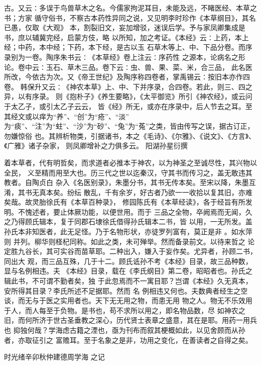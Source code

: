\documentclass[12pt,UTF8]{ctexbook}
\begin{document}
古。又云∶多误于鸟兽草木之名。今儒家拘泥耳目，未能及远，不睹医经、本草之书；方家 
循守俗书，不察古本药性异同之说，又见明李时珍作《本草纲目》，其名已愚，仅取《大观》 
本，割裂旧文，妄加增驳，迷误后学。予与家凤卿集成是书，庶以辅冀完经，启蒙方伎，略 
以所知，加之考证。《本经》云∶上药，本上经；中药，本中经；下药，本下经，是古以玉 
石草木等上、中、下品分卷。而序录别为一卷。陶序朱书云∶《本草经》卷上注云∶序药性 
之源本，论病名之形论。卷中云∶玉石、草木三品。卷下云∶虫、兽、果、菜、米，合三品， 
此名医所改，今依古为次。又《帝王世纪》及陶序称四卷者，掌禹锡云∶按旧本亦作四卷。 
韩保升又云∶《神农本草》上、中、下并序录，合四卷。若此，则三、四之异，以有序录。 
则《抱朴子》《养生要略》，《太平御览》所引《神农经》，或云问于太乙子，或引太乙子云云， 
皆《经》所无，或亦在序录中，后人节去之耳。至其经文或以痒为“养”、“创”为“疮”、“淡” 
为“痰”、“注”为“蛀”、“沙”为“砂”、“兔”为“菟”之类，皆由传写之误，据古订正， 
勿嫌惊俗 
也。其辨析物类，引据诸书，本之《毛诗》、《尔雅》、《说文》、《方言》、《广雅》诸子杂家， 
则凤卿增补之力俱多云。 
阳湖孙星衍撰

着本草者，代有明哲矣，而求道者必推本于神农，以为神圣之至诚尽性，其兴物以全民， 
义至精而用至大也。历三代之世以迄秦汉，守其书而传习之，盖无敢违其教者。自陶贞白 
杂入《名医别录》，朱墨分书，其书无传本矣。至宋以降，朱墨互淆，其书无真本矣。纷纭 
散乱，千有余岁，好古者乃欲一一收拾以复其旧，亦难矣哉。故灵胎徐氏有《本草百种录》， 
修园陈氏有《本草经读》，各于经旨有所发明。不愧述者，要止体厥功能，以便世用。而于 
三品之全物，卒阙焉而无闻，久之乃得顾氏辑本，复于同郡石埭徐氏借得孙氏辑本二书，皆 
以用，一无所发。盖孙氏本非知医者，此无足怪。乃于名物形状，亦徒罗列富有，莫正是非 
。如水萍则 并列。柳华则柽杞同称。如此之类，未可殚举。然而备录前文。以待来哲之 
论定胜九谷长，其可实谷而苗草耶。二种出入，嫌入于妄作矣。尤异者，孙顾二书，同出大 
观，而三品互殊，几于十二。顾氏诋孙不考《本经》目录，故三品种数，显与名例相违。夫 
《本经》目录，载在《李氏纲目》第二卷，昭昭者也。孙氏之辑此书，不可谓不勤者矣，独 
于此忽焉而不一寓目耶？岂谓《本经》久无真本，安所得其目录？李氏所述不足据耶。然而 
名 
例相违又何也。夫数典者经生之空谈，而无与于医之实用者也。天下无无用之物，而患无用 
物之人。物无不乐效用于人，而人每至于负物。是书也，苟不求所以用之，即名物品数，尽 
如神农之旧，而何所济于世古圣垂教之深心，历代贤士表章之盛意，其在是耶。用药一用兵 
也 
抑独何哉？学海虑古籍之湮也，亟为刊布而叙其梗概如此，以见舍顾而从孙者，亦取征引之 
富赡耳。至于名象之是非，功用之变化，在善读者之自得之矣。 

时光绪辛卯秋仲建德周学海 之记
	
\mainmatter
\end{document}
